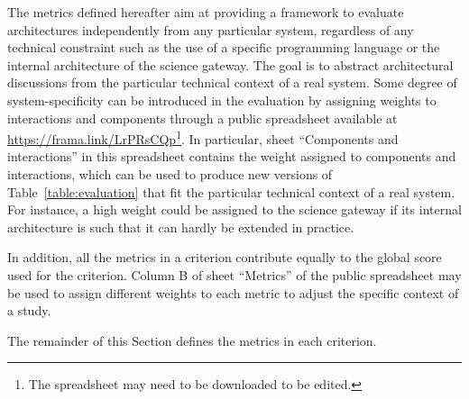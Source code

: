 \documentclass[preprint,3p,twocolumn]{elsarticle}
\newcommand{\correction}[1]{\color{blue}#1\color{black}\xspace}
\begin{document}
\correction{The metrics defined hereafter aim at providing a framework
  to evaluate architectures independently from any particular system,
  regardless of any technical constraint such as the use of a specific
  programming language or the internal architecture of the science
  gateway. The goal is to abstract architectural discussions from the
  particular technical context of a real system. Some degree of
  system-specificity can be introduced in the evaluation by assigning
  weights to interactions and components through a public spreadsheet
  available at \url{https://frama.link/LrPRsCQp}\footnote{The
    spreadsheet may need to be downloaded to be edited.}. In
  particular, sheet ``Components and interactions'' in this
  spreadsheet contains the weight assigned to components and
  interactions, which can be used to produce new versions of
  Table~\ref{table:evaluation} that fit the particular technical
  context of a real system. For instance, a high weight could be
  assigned to the science gateway if its internal architecture is such
  that it can hardly be extended in practice.}

\correction{In addition, all the metrics in a criterion contribute
  equally to the global score used for the criterion. Column B of
  sheet ``Metrics'' of the public spreadsheet may be used to assign
  different weights to each metric to adjust the specific context of a
  study.

  The remainder of this Section defines the metrics in each criterion.
}
\end{document}
